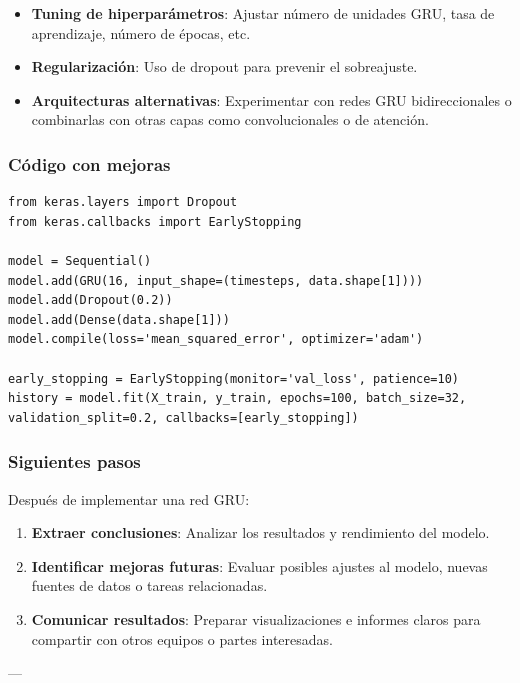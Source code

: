 \documentclass[11pt]{article}
\begin{document}
\begin{itemize}
\item \textbf{\textbf{Tuning de hiperparámetros}}: Ajustar número de unidades GRU, tasa de aprendizaje, número de épocas, etc.

\item \textbf{\textbf{Regularización}}: Uso de dropout para prevenir el sobreajuste.

\item \textbf{\textbf{Arquitecturas alternativas}}: Experimentar con redes GRU bidireccionales o combinarlas con otras capas como convolucionales o de atención.
\end{itemize}

\subsubsection{Código con mejoras}
\label{sec:org8924f6e}
\begin{verbatim}
from keras.layers import Dropout
from keras.callbacks import EarlyStopping

model = Sequential()
model.add(GRU(16, input_shape=(timesteps, data.shape[1])))
model.add(Dropout(0.2))
model.add(Dense(data.shape[1]))
model.compile(loss='mean_squared_error', optimizer='adam')

early_stopping = EarlyStopping(monitor='val_loss', patience=10)
history = model.fit(X_train, y_train, epochs=100, batch_size=32, validation_split=0.2, callbacks=[early_stopping])
\end{verbatim}

\subsubsection{Siguientes pasos}
\label{sec:org0139d66}
Después de implementar una red GRU:

\begin{enumerate}
\item \textbf{\textbf{Extraer conclusiones}}: Analizar los resultados y rendimiento del modelo.

\item \textbf{\textbf{Identificar mejoras futuras}}: Evaluar posibles ajustes al modelo, nuevas fuentes de datos o tareas relacionadas.

\item \textbf{\textbf{Comunicar resultados}}: Preparar visualizaciones e informes claros para compartir con otros equipos o partes interesadas.
\end{enumerate}

---
\end{document}
